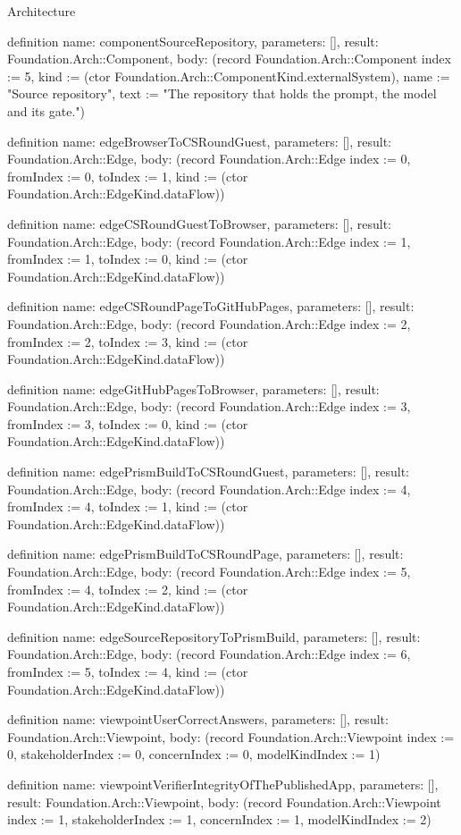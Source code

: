 \begin{lexlean}{Architecture}
\begin{semanticmodule}
definition{
  name: componentSourceRepository,
  parameters: [],
  result: Foundation.Arch::Component,
  body: (record Foundation.Arch::Component {index := 5, kind := (ctor Foundation.Arch::ComponentKind.externalSystem), name := "Source repository", text := "The repository that holds the prompt, the model and its gate."})
}

definition{
  name: edgeBrowserToCSRoundGuest,
  parameters: [],
  result: Foundation.Arch::Edge,
  body: (record Foundation.Arch::Edge {index := 0, fromIndex := 0, toIndex := 1, kind := (ctor Foundation.Arch::EdgeKind.dataFlow)})
}

definition{
  name: edgeCSRoundGuestToBrowser,
  parameters: [],
  result: Foundation.Arch::Edge,
  body: (record Foundation.Arch::Edge {index := 1, fromIndex := 1, toIndex := 0, kind := (ctor Foundation.Arch::EdgeKind.dataFlow)})
}

definition{
  name: edgeCSRoundPageToGitHubPages,
  parameters: [],
  result: Foundation.Arch::Edge,
  body: (record Foundation.Arch::Edge {index := 2, fromIndex := 2, toIndex := 3, kind := (ctor Foundation.Arch::EdgeKind.dataFlow)})
}

definition{
  name: edgeGitHubPagesToBrowser,
  parameters: [],
  result: Foundation.Arch::Edge,
  body: (record Foundation.Arch::Edge {index := 3, fromIndex := 3, toIndex := 0, kind := (ctor Foundation.Arch::EdgeKind.dataFlow)})
}

definition{
  name: edgePrismBuildToCSRoundGuest,
  parameters: [],
  result: Foundation.Arch::Edge,
  body: (record Foundation.Arch::Edge {index := 4, fromIndex := 4, toIndex := 1, kind := (ctor Foundation.Arch::EdgeKind.dataFlow)})
}

definition{
  name: edgePrismBuildToCSRoundPage,
  parameters: [],
  result: Foundation.Arch::Edge,
  body: (record Foundation.Arch::Edge {index := 5, fromIndex := 4, toIndex := 2, kind := (ctor Foundation.Arch::EdgeKind.dataFlow)})
}

definition{
  name: edgeSourceRepositoryToPrismBuild,
  parameters: [],
  result: Foundation.Arch::Edge,
  body: (record Foundation.Arch::Edge {index := 6, fromIndex := 5, toIndex := 4, kind := (ctor Foundation.Arch::EdgeKind.dataFlow)})
}

definition{
  name: viewpointUserCorrectAnswers,
  parameters: [],
  result: Foundation.Arch::Viewpoint,
  body: (record Foundation.Arch::Viewpoint {index := 0, stakeholderIndex := 0, concernIndex := 0, modelKindIndex := 1})
}

definition{
  name: viewpointVerifierIntegrityOfThePublishedApp,
  parameters: [],
  result: Foundation.Arch::Viewpoint,
  body: (record Foundation.Arch::Viewpoint {index := 1, stakeholderIndex := 1, concernIndex := 1, modelKindIndex := 2})
}


\end{semanticmodule}
\end{lexlean}

